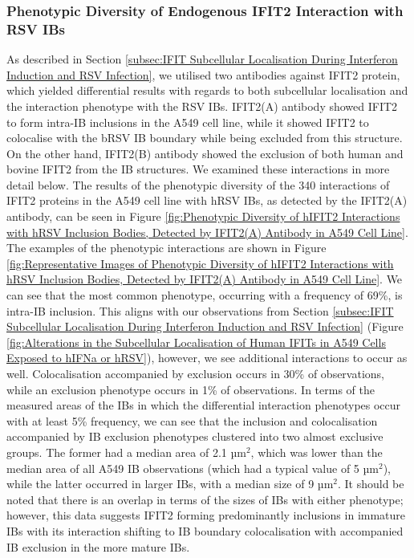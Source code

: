 \subsubsection{Phenotypic Diversity of Endogenous IFIT2 Interaction with RSV IBs}
As described in Section \ref{subsec:IFIT Subcellular Localisation During Interferon Induction and RSV Infection}, we utilised two antibodies against IFIT2 protein, which yielded differential results with regards to both subcellular localisation and the interaction phenotype with the RSV IBs. IFIT2(A) antibody showed IFIT2 to form intra-IB inclusions in the A549 cell line, while it showed IFIT2 to colocalise with the bRSV IB boundary while being excluded from this structure. On the other hand, IFIT2(B) antibody showed the exclusion of both human and bovine IFIT2 from the IB structures. We examined these interactions in more detail below. The results of the phenotypic diversity of the 340 interactions of IFIT2 proteins in the A549 cell line with hRSV IBs, as detected by the IFIT2(A) antibody, can be seen in Figure \ref{fig:Phenotypic Diversity of hIFIT2 Interactions with hRSV Inclusion Bodies, Detected by IFIT2(A) Antibody in A549 Cell Line}. The examples of the phenotypic interactions are shown in Figure \ref{fig:Representative Images of Phenotypic Diversity of hIFIT2 Interactions with hRSV Inclusion Bodies, Detected by IFIT2(A) Antibody in A549 Cell Line}. We can see that the most common phenotype, occurring with a frequency of 69\%, is intra-IB inclusion. This aligns with our observations from Section \ref{subsec:IFIT Subcellular Localisation During Interferon Induction and RSV Infection} (Figure \ref{fig:Alterations in the Subcellular Localisation of Human IFITs in A549 Cells Exposed to hIFNa or hRSV}), however, we see additional interactions to occur as well. Colocalisation accompanied by exclusion occurs in 30\% of observations, while an exclusion phenotype occurs in 1\% of observations. In terms of the measured areas of the IBs in which the differential interaction phenotypes occur with at least 5\% frequency, we can see that the inclusion and colocalisation accompanied by IB exclusion phenotypes clustered into two almost exclusive groups. The former had a median area of 2.1 \(\mbox{µm}^2\), which was lower than the median area of all A549 IB observations (which had a typical value of 5 \(\mbox{µm}^2\)), while the latter occurred in larger IBs, with a median size of 9 \(\mbox{µm}^2\). It should be noted that there is an overlap in terms of the sizes of IBs with either phenotype; however, this data suggests IFIT2 forming predominantly inclusions in immature IBs with its interaction shifting to IB boundary colocalisation with accompanied IB exclusion in the more mature IBs.

